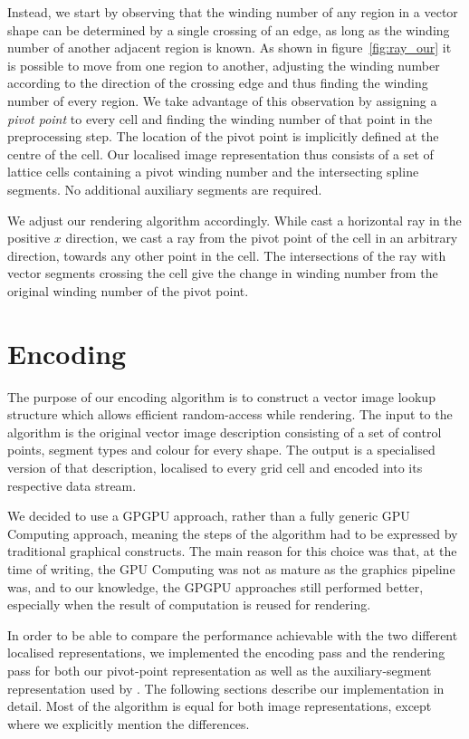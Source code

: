 \documentclass[11pt,a4paper,twoside]{article}
\begin{document}
Instead, we start by observing that the winding number of any region in a vector shape can be determined by a single crossing of an edge, as long as the winding number of another adjacent region is known. As shown in figure~\ref{fig:ray_our} it is possible to move from one region to another, adjusting the winding number according to the direction of the crossing edge and thus finding the winding number of every region. We take advantage of this observation by assigning a \emph{pivot point} to every cell and finding the winding number of that point in the preprocessing step. The location of the pivot point is implicitly defined at the centre of the cell. Our localised image representation thus consists of a set of lattice cells containing a pivot winding number and the intersecting spline segments. No additional auxiliary segments are required.

We adjust our rendering algorithm accordingly. While \cite{NehabHoppe08} cast a horizontal ray in the positive $x$ direction, we cast a ray from the pivot point of the cell in an arbitrary direction, towards any other point in the cell. The intersections of the ray with vector segments crossing the cell give the change in winding number from the original winding number of the pivot point.

\section{Encoding}

The purpose of our encoding algorithm is to construct a vector image lookup structure which allows efficient random-access while rendering. The input to the algorithm is the original vector image description consisting of a set of control points, segment types and colour for every shape. The output is a specialised version of that description, localised to every grid cell and encoded into its respective data stream.

We decided to use a GPGPU approach, rather than a fully generic GPU Computing approach, meaning the steps of the algorithm had to be expressed by traditional graphical constructs. The main reason for this choice was that, at the time of writing, the GPU Computing was not as mature as the graphics pipeline was, and to our knowledge, the GPGPU approaches still performed better, especially when the result of computation is reused for rendering.

In order to be able to compare the performance achievable with the two different localised representations, we implemented the encoding pass and the rendering pass for both our pivot-point representation as well as the auxiliary-segment representation used by \cite{NehabHoppe08}. The following sections describe our implementation in detail. Most of the algorithm is equal for both image representations, except where we explicitly mention the differences.
\end{document}
